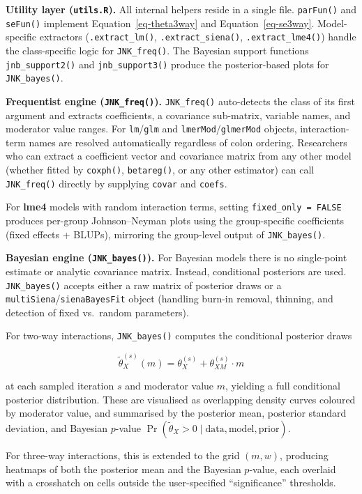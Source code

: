 \documentclass[
  letterpaper,
  DIV=11,
  numbers=noendperiod]{scrartcl}
\begin{document}
\textbf{Utility layer (\texttt{utils.R}).} All internal helpers reside
in a single file. \texttt{parFun()} and \texttt{seFun()} implement
Equation~\ref{eq-theta3way} and Equation~\ref{eq-se3way}. Model-specific
extractors (\texttt{.extract\_lm()}, \texttt{.extract\_siena()},
\texttt{.extract\_lme4()}) handle the class-specific logic for
\texttt{JNK\_freq()}. The Bayesian support functions
\texttt{jnb\_support2()} and \texttt{jnb\_support3()} produce the
posterior-based plots for \texttt{JNK\_bayes()}.

\textbf{Frequentist engine (\texttt{JNK\_freq()}).} \texttt{JNK\_freq()}
auto-detects the class of its first argument and extracts coefficients,
a covariance sub-matrix, variable names, and moderator value ranges. For
\texttt{lm}/\texttt{glm} and \texttt{lmerMod}/\texttt{glmerMod} objects,
interaction-term names are resolved automatically regardless of colon
ordering. Researchers who can extract a coefficient vector and
covariance matrix from any other model (whether fitted by
\texttt{coxph()}, \texttt{betareg()}, or any other estimator) can call
\texttt{JNK\_freq()} directly by supplying \texttt{covar} and
\texttt{coefs}.

For \textbf{lme4} models with random interaction terms, setting
\texttt{fixed\_only\ =\ FALSE} produces per-group Johnson--Neyman plots
using the group-specific coefficients (fixed effects + BLUPs), mirroring
the group-level output of \texttt{JNK\_bayes()}.

\textbf{Bayesian engine (\texttt{JNK\_bayes()}).} For Bayesian models
there is no single-point estimate or analytic covariance matrix.
Instead, conditional posteriors are used. \texttt{JNK\_bayes()} accepts
either a raw matrix of posterior draws or a
\texttt{multiSiena}/\texttt{sienaBayesFit} object (handling burn-in
removal, thinning, and detection of fixed vs.~random parameters).

For two-way interactions, \texttt{JNK\_bayes()} computes the conditional
posterior draws

\[
\tilde{\theta}_X^{(s)}(m) = \theta^{(s)}_X + \theta^{(s)}_{XM} \cdot m
\]

at each sampled iteration \(s\) and moderator value \(m\), yielding a
full conditional posterior distribution. These are visualised as
overlapping density curves coloured by moderator value, and summarised
by the posterior mean, posterior standard deviation, and Bayesian
\(p\)-value
\(\Pr(\tilde{\theta}_X > 0 \mid \text{data}, \text{model}, \text{prior})\).

For three-way interactions, this is extended to the grid \((m, w)\),
producing heatmaps of both the posterior mean and the Bayesian
\(p\)-value, each overlaid with a crosshatch on cells outside the
user-specified ``significance'' thresholds.
\end{document}
